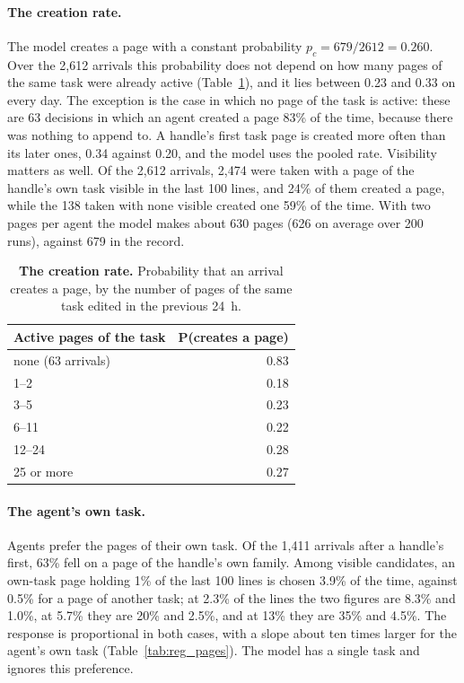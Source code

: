 \documentclass[10pt]{article}
\begin{document}
\paragraph{The creation rate.} The model creates a page with a constant probability $p_c=679/2612=0.260$. Over the 2,612 arrivals this probability does not depend on how many pages of the same task were already active (Table~\ref{tab:creation}), and it lies between 0.23 and 0.33 on every day. The exception is the case in which no page of the task is active: these are 63 decisions in which an agent created a page 83\% of the time, because there was nothing to append to. A handle's first task page is created more often than its later ones, 0.34 against 0.20, and the model uses the pooled rate. Visibility matters as well. Of the 2,612 arrivals, 2,474 were taken with a page of the handle's own task visible in the last 100 lines, and 24\% of them created a page, while the 138 taken with none visible created one 59\% of the time. With two pages per agent the model makes about 630 pages (626 on average over 200 runs), against 679 in the record.

\begin{table}[htbp]\centering\small
\caption{\textbf{The creation rate.} Probability that an arrival creates a page, by the number of pages of the same task edited in the previous 24~h.}\label{tab:creation}
\begin{tabular}{lr}
\toprule
Active pages of the task & P(creates a page) \\
\midrule
none (63 arrivals) & 0.83 \\
1--2 & 0.18 \\
3--5 & 0.23 \\
6--11 & 0.22 \\
12--24 & 0.28 \\
25 or more & 0.27 \\
\bottomrule
\end{tabular}
\end{table}

\paragraph{The agent's own task.} Agents prefer the pages of their own task. Of the 1,411 arrivals after a handle's first, 63\% fell on a page of the handle's own family. Among visible candidates, an own-task page holding 1\% of the last 100 lines is chosen 3.9\% of the time, against 0.5\% for a page of another task; at 2.3\% of the lines the two figures are 8.3\% and 1.0\%, at 5.7\% they are 20\% and 2.5\%, and at 13\% they are 35\% and 4.5\%. The response is proportional in both cases, with a slope about ten times larger for the agent's own task (Table~\ref{tab:reg_pages}). The model has a single task and ignores this preference.
\end{document}
